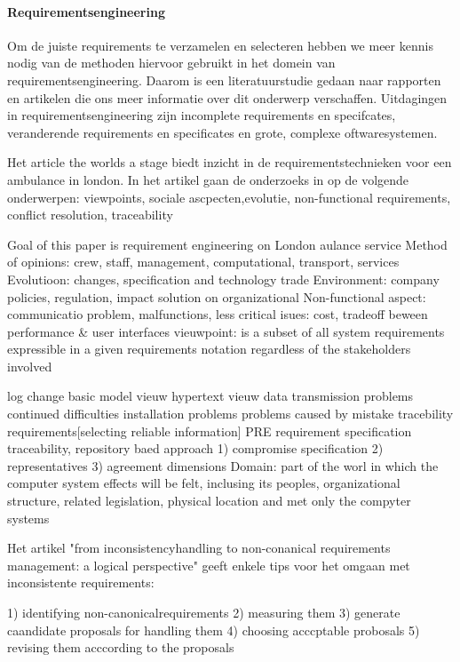 \paragraph{Requirementsengineering}

Om de juiste requirements te verzamelen en selecteren hebben we meer kennis nodig van de methoden hiervoor gebruikt in het domein van requirementsengineering. Daarom is een literatuurstudie gedaan naar rapporten en artikelen die ons meer informatie over dit onderwerp verschaffen.
 Uitdagingen in requirementsengineering zijn incomplete requirements en specifcates, veranderende requirements en specificates en grote, complexe oftwaresystemen.
 
 Het article the worlds a stage biedt inzicht in de requirementstechnieken voor een ambulance in london. In het artikel gaan de onderzoeks in op de volgende onderwerpen: 
 viewpoints, sociale ascpecten,evolutie, non-functional requirements, conflict resolution, traceability
 
 Goal of this paper is requirement  engineering on London aulance service
 Method of opinions: crew, staff, management, computational, transport, services
 Evolutioon: changes, specification and technology trade
 Environment: company policies, regulation, impact solution on organizational
 Non-functional aspect: communicatio problem, malfunctions, less critical isues: cost, tradeoff beween performance \& user interfaces
 vieuwpoint: is a subset of all system requirements expressible in a given requirements notation regardless of the stakeholders involved
 
 log change
 basic model vieuw
 hypertext vieuw
 data transmission problems
 continued difficulties
 installation problems
 problems caused by mistake
 tracebility requirements[selecting reliable information]
 PRE requirement specification traceability, repository baed approach
 1) compromise specification
 2) representatives
 3) agreement dimensions
 Domain: part of the worl in which the computer system effects will be felt, inclusing its peoples, organizational structure, related legislation, physical location and met only the compyter systems
 
 
 Het artikel "from inconsistencyhandling to non-conanical requirements management: a logical perspective" geeft enkele tips voor het omgaan met inconsistente requirements:
 
 1) identifying non-canonicalrequirements
 2) measuring them
 3) generate caandidate proposals for handling them
 4) choosing acccptable probosals
 5) revising them acccording to the proposals

